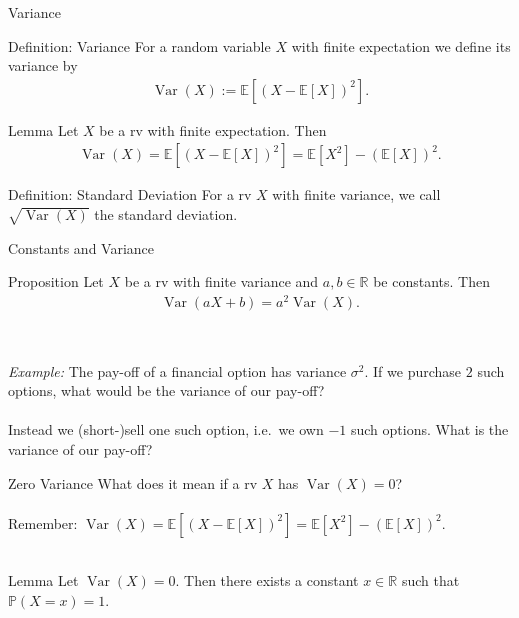 \documentclass[11pt,pdf,ngerman,UKenglish]{beamer}%
\newcommand{\IR}{\mathds{R}}
\newcommand{\IP}{\mathbb{P}}
\newcommand{\IE}{{\mathbb{E}}}
\newcommand{\1}{\mathbb{1}}
\newcommand{\Var}{\operatorname{Var}}
\newcommand{\var}{\operatorname{Var}}
\theoremstyle{thm}
\theoremstyle{def}
\begin{document}
\begin{frame}{Variance}
\begin{block}{Definition: Variance}
For a random variable $X$ with finite expectation we define its variance by
\begin{align*}
\Var (X) := \IE\left[ \left( X - \IE[X] \right)^2 \right].
\end{align*}
\end{block}
\pause
\begin{block}{Lemma}
Let $X$ be a rv with finite expectation. Then
\begin{align*}
\Var(X) = \IE\left[ \left( X - \IE[X] \right)^2 \right]
= \IE\left[ X^2 \right] - (\IE[X])^2.
\end{align*}
\end{block}
\pause
\begin{block}{Definition: Standard Deviation}
For a rv $X$ with finite variance, we call $\sqrt{ \var(X)}$ the standard deviation.
\end{block}
\end{frame}


\begin{frame}{Constants and Variance}
\begin{block}{Proposition}
Let $X$ be a rv with finite variance and $a,b\in \IR$ be constants. Then
\begin{align*}
\Var(aX+b) = a^2 \Var(X).
\end{align*}
\end{block}
\ \pause

\textit{Example:}
The pay-off of a financial option has variance $\sigma^2$. If we purchase $2$ such options, what would be the variance of our pay-off?
\\ \ \\ \pause
Instead we (short-)sell one such option, i.e.\ we own $-1$ such options. What is the variance of our pay-off?
\end{frame}


\begin{frame}{Zero Variance}
What does it mean if a rv $X$ has $\Var(X)=0$?
\\ \ \\
Remember: $\Var(X) = \IE\left[ (X-\IE[X])^2 \right] = \IE\left[ X^2\right] - ( \IE[X])^2$.
\\ \
\pause
\begin{block}{Lemma}
Let $\Var(X)=0$. Then there exists a constant $x\in\IR$ such that $\IP(X=x)=1$.
\end{block}
\vfill
\end{frame}
\end{document}
